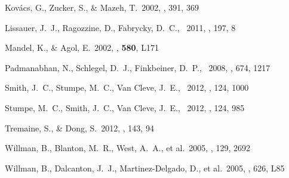 \documentclass[letterpaper,12pt,preprint]{hack_aastex}
\begin{document}
\begin{thebibliography}{}
Kov{\'a}cs, G., Zucker, S., \& Mazeh, T.\ 2002, \aap, 391, 369

Lissauer, J.~J., Ragozzine, D., Fabrycky, D.~C., \etal\ 2011, \apjs, 197, 8

Mandel, K., \& Agol, E.\ 2002, \apjl, \textbf{580}, L171

Padmanabhan, N., Schlegel, D.~J., Finkbeiner, D.~P., \etal\ 2008, \apj, 674, 1217

Smith, J.~C., Stumpe, M.~C., Van Cleve, J.~E., \etal\ 2012, \pasp, 124, 1000

Stumpe, M.~C., Smith, J.~C., Van Cleve, J.~E., \etal\ 2012, \pasp, 124, 985

Tremaine, S., \& Dong, S.\ 2012, \aj, 143, 94

Willman, B., Blanton, M.~R., West, A.~A., et al.\ 2005, \aj, 129, 2692

Willman, B., Dalcanton, J.~J., Martinez-Delgado, D., et al.\ 2005, \apjl, 626, L85
\end{thebibliography}
\end{document}
